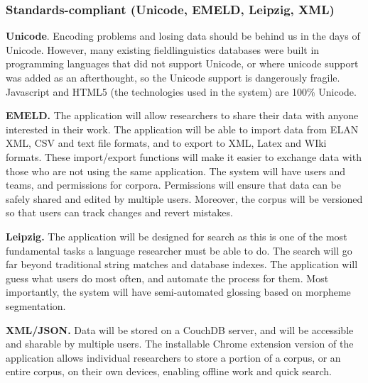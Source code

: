 \documentclass[letterpaper, 12pt, dvips]{mitwpl}
\begin{document}
\subsubsection{Standards-compliant (Unicode, EMELD, Leipzig, XML)}


\begin{description}
\item {\bf Unicode}. Encoding problems and losing data should be behind us in the days of Unicode. However, many existing fieldlinguistics databases were built in programming languages that did not support Unicode, or where unicode support was added as an afterthought, so the Unicode support is dangerously fragile. Javascript and HTML5 (the technologies used in the system) are 100\% Unicode.


\item {\bf EMELD.} The application will allow researchers to share their data with anyone interested in their work. The application will be able to import data from ELAN XML, CSV and text file formats, and to export to XML, Latex and WIki formats. These import/export functions will make it easier to exchange data with those who are not using the same application.  The system will have users and teams, and permissions for corpora. Permissions will ensure that data can be safely shared and edited by multiple users. Moreover, the corpus will be versioned so that users can track changes and revert mistakes.


\item {\bf  Leipzig.} The application will be designed for search as this is one of the most fundamental tasks a language researcher must be able to do. The search will go far beyond traditional string matches and database indexes. The application will guess what users do most often, and automate the process for them. Most importantly, the system will have semi-automated  glossing based on morpheme segmentation.


\item {\bf XML/JSON.} Data will be stored on a CouchDB server, and will be accessible and sharable by multiple users.  The installable Chrome extension version of the application allows individual researchers to store a portion of a corpus, or an entire corpus, on their own devices, enabling offline work and quick search. 

\end{description}
\end{document}
